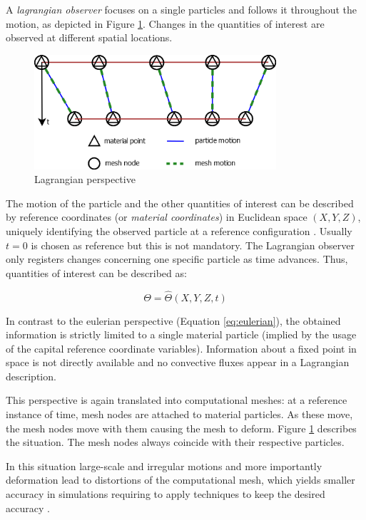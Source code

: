 A \textit{lagrangian observer} focuses on a single particles and follows it throughout the motion, as depicted in Figure \ref{fig:lagrangian}. Changes in the quantities of interest are observed at different spatial locations. 

\begin{figure}[htbp!]
	\centering
	\includegraphics[width=0.8\textwidth]{images/lagrangian}
	\caption{Lagrangian perspective}
	\label{fig:lagrangian}
\end{figure}

The motion of the particle and the other quantities of interest can be described by reference coordinates (or \textit{material coordinates}) in Euclidean space $(X, Y, Z)$, uniquely identifying the observed particle at a reference configuration \cite{XING201957}. Usually $t = 0$ is chosen as reference but this is not mandatory. The Lagrangian observer only registers changes concerning one specific particle as time advances. Thus, quantities of interest can be described as:

\begin{equation}
	\Theta = \hat{\Theta}(X, Y, Z, t)
\end{equation}

In contrast to the eulerian perspective (Equation \ref{eq:eulerian}), the obtained information is strictly limited to a single material particle (implied by the usage of the capital reference coordinate variables). 
Information about a fixed point in space is not directly available and no convective fluxes appear in a Lagrangian description.

This perspective is again translated into computational meshes: at a reference instance of time, mesh nodes are attached to material particles. As these move, the mesh nodes move with them causing the mesh to deform. Figure \ref{fig:lagrangian} describes the situation. The mesh nodes always coincide with their respective particles.

In this situation large-scale and irregular motions and more importantly deformation lead to distortions of the computational mesh, which yields smaller accuracy in simulations requiring to apply techniques to keep the desired accuracy \cite{lipton2010robustness}.

